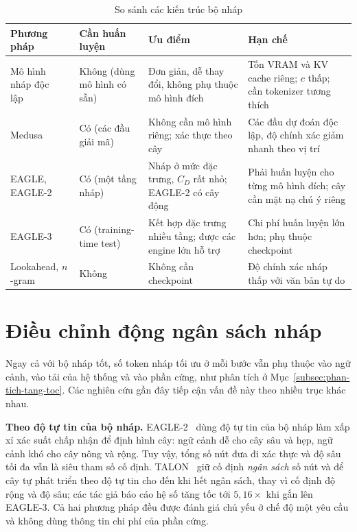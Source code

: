 \begin{table}[htbp]
\centering
\caption{So sánh các kiến trúc bộ nháp}
\label{tab:so-sanh-nhap}
\small
\begin{tabularx}{\linewidth}{@{}>{\raggedright\arraybackslash}p{27mm}>{\raggedright\arraybackslash}p{21mm}>{\raggedright\arraybackslash}X>{\raggedright\arraybackslash}X@{}}
\toprule
\textbf{Phương pháp} & \textbf{Cần huấn luyện} & \textbf{Ưu điểm} & \textbf{Hạn chế} \\
\midrule
Mô hình nháp độc lập~\cite{leviathan2023speculative,chen2023speculative} & Không (dùng mô hình có sẵn) & Đơn giản, dễ thay đổi, không phụ thuộc mô hình đích & Tốn VRAM và KV cache riêng; $c$ thấp; cần tokenizer tương thích \\
Medusa~\cite{cai2024medusa} & Có (các đầu giải mã) & Không cần mô hình riêng; xác thực theo cây & Các đầu dự đoán độc lập, độ chính xác giảm nhanh theo vị trí \\
EAGLE, EAGLE-2~\cite{li2024eagle,li2024eagle2} & Có (một tầng nháp) & Nháp ở mức đặc trưng, $C_D$ rất nhỏ; EAGLE-2 có cây động & Phải huấn luyện cho từng mô hình đích; cây cần mặt nạ chú ý riêng \\
EAGLE-3~\cite{li2025eagle3} & Có (training-time test) & Kết hợp đặc trưng nhiều tầng; được các engine lớn hỗ trợ & Chi phí huấn luyện lớn hơn; phụ thuộc checkpoint \\
Lookahead, $n$-gram~\cite{fu2024lookahead} & Không & Không cần checkpoint & Độ chính xác nháp thấp với văn bản tự do \\
\bottomrule
\end{tabularx}
\end{table}

\section{Điều chỉnh động ngân sách nháp}
\label{sec:dieu-chinh-dong}

Ngay cả với bộ nháp tốt, số token nháp tối ưu ở mỗi bước vẫn phụ thuộc vào ngữ cảnh, vào tải của hệ thống và vào phần cứng, như phân tích ở Mục~\ref{subsec:phan-tich-tang-toc}. Các nghiên cứu gần đây tiếp cận vấn đề này theo nhiều trục khác nhau.

\textbf{Theo độ tự tin của bộ nháp.} EAGLE-2~\cite{li2024eagle2} dùng độ tự tin của bộ nháp làm xấp xỉ xác suất chấp nhận để định hình cây: ngữ cảnh dễ cho cây sâu và hẹp, ngữ cảnh khó cho cây nông và rộng. Tuy vậy, tổng số nút đưa đi xác thực và độ sâu tối đa vẫn là siêu tham số cố định. TALON~\cite{liu2026talon} giữ cố định \emph{ngân sách} số nút và để cây tự phát triển theo độ tự tin cho đến khi hết ngân sách, thay vì cố định độ rộng và độ sâu; các tác giả báo cáo hệ số tăng tốc tới $5{,}16\times$ khi gắn lên EAGLE-3. Cả hai phương pháp đều được đánh giá chủ yếu ở chế độ một yêu cầu và không dùng thông tin chi phí của phần cứng.

